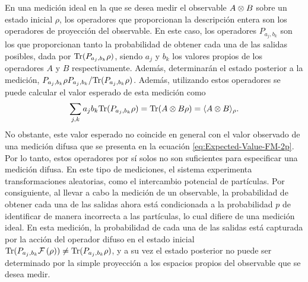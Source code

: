 En una medición ideal en la que se desea medir el observable $A\otimes B$ sobre
un estado inicial $\rho$, los operadores que proporcionan la descripción entera
son los operadores de proyección del observable. En este caso, los operadores
$P_{a_j, b_k}$ son los que proporcionan tanto la probabilidad de obtener cada
una de las salidas posibles, dada por ${\rm Tr}(P_{a_j,b_k}\rho )$, siendo $a_j$ y
$b_k$ los valores propios de los operadores $A$ y $B$ respectivamente. Además,
determinarán el estado posterior a la medición, $P_{a_j,b_k}\rho
P_{a_j,b_k}/{\rm Tr}(P_{a_j,b_k}\rho )$. Además, utilizando estos operadores se
puede calcular el valor esperado de esta medición como \[\sum_{j,k}a_j
b_k{\rm Tr}(P_{a_j,b_k}\rho)= {\rm Tr}(A\otimes B \rho)=\langle A\otimes
B\rangle_{\rho}.\] No obstante, este valor esperado no coincide en general con
el valor observado de una medición difusa que se presenta en la ecuación
{\eqref{eq:Expected-Value-FM-2p}}. Por lo tanto, estos operadores por sí solos
no son suficientes para especificar una medición difusa. En este tipo de
mediciones, el sistema experimenta transformaciones aleatorias, como el
intercambio potencial de partículas. Por consiguiente, al llevar a cabo la
medición de un observable, la probabilidad de obtener cada una de las salidas
ahora está condicionada a la probabilidad $p$ de identificar de manera
incorrecta a las partículas, lo cual difiere de una medición ideal. En esta
medición, la probabilidad de cada una de las salidas está capturada por la
acción del operador difuso en el estado inicial
${\rm Tr}(P_{a_j,b_k}\mathcal{F}\left(\rho\right))\ne{\rm Tr}(P_{a_j,b_k}\rho ) $, y a su vez el estado
posterior no puede ser determinado por la simple proyección a los espacios
propios del observable que se desea medir.



